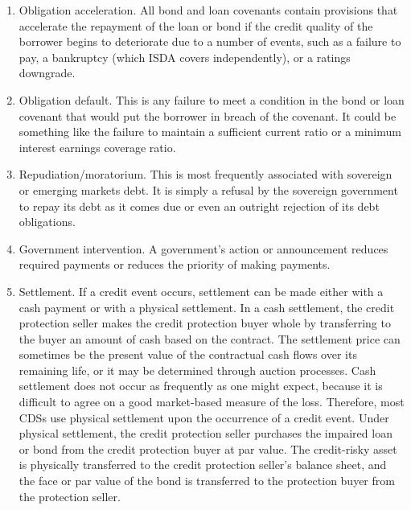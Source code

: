 \documentclass[11pt]{article}
\begin{document}
\begin{enumerate}
  \item Obligation acceleration. All bond and loan covenants contain provisions that accelerate the repayment of the loan or bond if the credit quality of the borrower begins to deteriorate due to a number of events, such as a failure to pay, a bankruptcy (which ISDA covers independently), or a ratings downgrade.

  \item Obligation default. This is any failure to meet a condition in the bond or loan covenant that would put the borrower in breach of the covenant. It could be something like the failure to maintain a sufficient current ratio or a minimum interest earnings coverage ratio.

  \item Repudiation/moratorium. This is most frequently associated with sovereign or emerging markets debt. It is simply a refusal by the sovereign government to repay its debt as it comes due or even an outright rejection of its debt obligations.

  \item Government intervention. A government's action or announcement reduces required payments or reduces the priority of making payments.

  \item Settlement. If a credit event occurs, settlement can be made either with a cash payment or with a physical settlement. In a cash settlement, the credit protection seller makes the credit protection buyer whole by transferring to the buyer an amount of cash based on the contract. The settlement price can sometimes be the present value of the contractual cash flows over its remaining life, or it may be determined through auction processes. Cash settlement does not occur as frequently as one might expect, because it is difficult to agree on a good market-based measure of the loss. Therefore, most CDSs use physical settlement upon the occurrence of a credit event. Under physical settlement, the credit protection seller purchases the impaired loan or bond from the credit protection buyer at par value. The credit-risky asset is physically transferred to the credit protection seller's balance sheet, and the face or par value of the bond is transferred to the protection buyer from the protection seller.


\end{enumerate}
\end{document}
